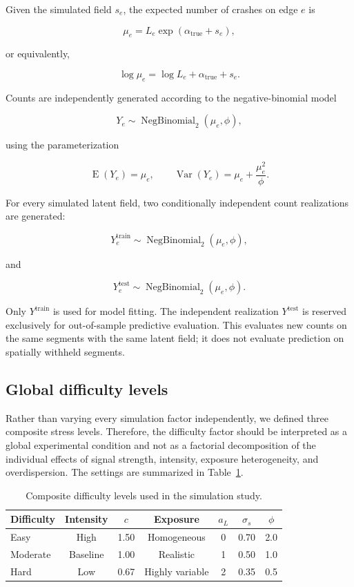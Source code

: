 \documentclass[11pt]{article}
\begin{document}
Given the simulated field $s_e$, the expected number of crashes on edge $e$ is

\[
\mu_e
=
L_e\exp(\alpha_{\mathrm{true}}+s_e),
\]

or equivalently,

\[
\log\mu_e
=
\log L_e+\alpha_{\mathrm{true}}+s_e.
\]

Counts are independently generated according to the negative-binomial model

\[
Y_e
\sim
\operatorname{NegBinomial}_2(\mu_e,\phi),
\]

using the parameterization

\[
\operatorname{E}(Y_e)=\mu_e,
\qquad
\operatorname{Var}(Y_e)
=
\mu_e+\frac{\mu_e^2}{\phi}.
\]

For every simulated latent field, two conditionally independent count realizations are generated:

\[
Y_e^{\mathrm{train}}
\sim
\operatorname{NegBinomial}_2(\mu_e,\phi),
\]

and

\[
Y_e^{\mathrm{test}}
\sim
\operatorname{NegBinomial}_2(\mu_e,\phi).
\]

Only $Y^{\mathrm{train}}$ is used for model fitting. The independent realization $Y^{\mathrm{test}}$ is reserved exclusively for out-of-sample predictive evaluation. This evaluates new counts on the same segments with the same latent field; it does not evaluate prediction on spatially withheld segments.

\subsection{Global difficulty levels}

Rather than varying every simulation factor independently, we defined three composite stress levels. Therefore, the difficulty factor should be interpreted as a global experimental condition and not as a factorial decomposition of the individual effects of signal strength, intensity, exposure heterogeneity, and overdispersion. The settings are summarized in Table~\ref{tab:simulation-difficulty}.

\begin{table}[!tbp]
	\centering
	\caption{Composite difficulty levels used in the simulation study.}
	\label{tab:simulation-difficulty}
	\begin{tabular}{lcccccc}
		\toprule
		Difficulty & Intensity & $c$ & Exposure & $a_L$ & $\sigma_s$ & $\phi$ \\
		\midrule
		Easy     & High     & 1.50 & Homogeneous     & 0 & 0.70 & 2.0 \\
		Moderate & Baseline & 1.00 & Realistic       & 1 & 0.50 & 1.0 \\
		Hard     & Low      & 0.67 & Highly variable & 2 & 0.35 & 0.5 \\
		\bottomrule
	\end{tabular}
\end{table}
\end{document}
